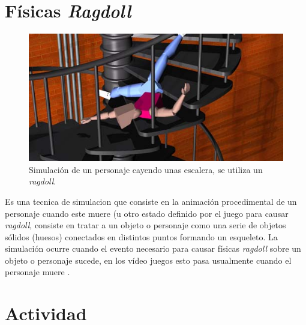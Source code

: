 \section{Físicas \emph{Ragdoll}}
\setlength\intextsep{0pt}
\begin{figure}
\includegraphics[width=\linewidth]{media/ragdoll.jpg}
\caption{Simulación de un personaje cayendo unas escalera, se utiliza un \emph{ragdoll}.}
\label{fig:ragdoll}
\end{figure}
Es una tecnica de simulacion que consiste en la animación procedimental de un personaje cuando este muere (u otro estado definido por el juego para causar \emph{ragdoll}, consiste en tratar a un objeto o personaje como una serie de objetos sólidos (huesos) conectados en distintos puntos formando un esqueleto. La simulación ocurre cuando el evento necesario para causar físicas \emph{ragdoll} sobre un objeto o personaje sucede, en los vídeo juegos esto pasa usualmente cuando el personaje muere \cite{eric_ragdoll}.

\section{Actividad}
